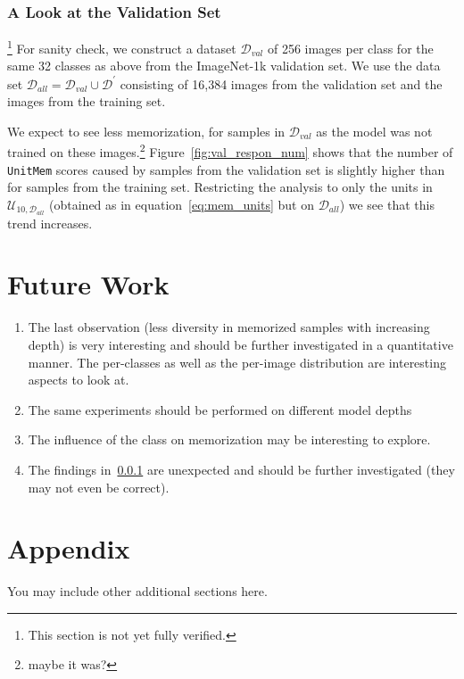 \documentclass{article} %
\begin{document}
\subsubsection{A Look at the Validation Set}\label{look_at_val}\footnote{This section is not yet fully verified.}
For sanity check, we construct a dataset $\mathcal{D}_{val}$ of 256 images per class for the same 32 classes as above from the ImageNet-1k validation set.
We use the data set $\mathcal{D}_{all} = \mathcal{D}_{val} \cup \mathcal{D}^\prime$ consisting of 16,384 images from the validation set and the images from the training set.

We expect to see less memorization, for samples in $\mathcal{D}_{val}$ as the model was not trained on these images.\footnote{maybe it was?}
Figure~\ref{fig:val_respon_num} shows that the number of \texttt{UnitMem} scores caused by samples from the validation set is slightly higher than for samples from the training set.
Restricting the analysis to only the units in $\mathcal{U}_{10,\mathcal{D}_{all}}$ (obtained as in equation~\ref{eq:mem_units} but on $\mathcal{D}_{all}$) we see that this trend increases.

\section{Future Work}
\begin{enumerate}
   \item The last observation (less diversity in memorized samples with increasing depth) is very interesting and should be further investigated in a quantitative manner.
   The per-classes as well as the per-image distribution are interesting aspects to look at.
   \item The same experiments should be performed on different model depths
   \item The influence of the class on memorization may be interesting to explore.
   \item The findings in~\ref{look_at_val} are unexpected and should be further investigated (they may not even be correct).
\end{enumerate}






\appendix
\section{Appendix}
You may include other additional sections here.
\end{document}
